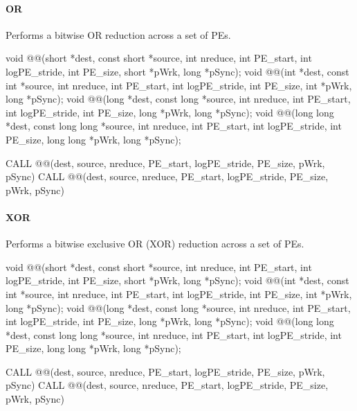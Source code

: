 \begin{apidefinition}
\paragraph{OR}
Performs a bitwise OR reduction across a set of \acp{PE}.\newline
\begin{Csynopsis}
void @@(short *dest, const short *source, int nreduce, int PE_start, int logPE_stride, int PE_size, short *pWrk, long *pSync);
void @@(int *dest, const int *source, int nreduce, int PE_start, int logPE_stride, int PE_size, int *pWrk, long *pSync);
void @@(long *dest, const long *source, int nreduce, int PE_start, int logPE_stride, int PE_size, long *pWrk, long *pSync);
void @@(long long *dest, const long long *source, int nreduce, int PE_start, int logPE_stride, int PE_size, long long *pWrk, long *pSync);
\end{Csynopsis}

\begin{Fsynopsis}
CALL @@(dest, source, nreduce, PE_start, logPE_stride, PE_size, pWrk, pSync)
CALL @@(dest, source, nreduce, PE_start, logPE_stride, PE_size, pWrk, pSync)
\end{Fsynopsis}

\paragraph{XOR}
Performs a bitwise exclusive OR (XOR) reduction across a set of \acp{PE}.\newline
\begin{Csynopsis}
void @@(short *dest, const short *source, int nreduce, int PE_start, int logPE_stride, int PE_size, short *pWrk, long *pSync);
void @@(int *dest, const int *source, int nreduce, int PE_start, int logPE_stride, int PE_size, int *pWrk, long *pSync);
void @@(long *dest, const long *source, int nreduce, int PE_start, int logPE_stride, int PE_size, long *pWrk, long *pSync);
void @@(long long *dest, const long long *source, int nreduce, int PE_start, int logPE_stride, int PE_size, long long *pWrk, long *pSync);
\end{Csynopsis}

\begin{Fsynopsis}
CALL @@(dest, source, nreduce, PE_start, logPE_stride, PE_size, pWrk, pSync)
CALL @@(dest, source, nreduce, PE_start, logPE_stride, PE_size, pWrk, pSync)
\end{Fsynopsis}


\end{apidefinition}
